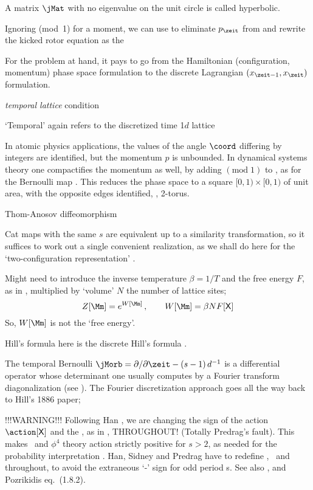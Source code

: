 \begin{description}
{A matrix $\jMat$ with no eigenvalue on the unit circle is called
hyperbolic.

Ignoring (mod~1) for a moment, we can use
 to eliminate
$p_{\zeit}$ from 
and rewrite the kicked rotor equation as the

For the problem at
hand, it pays to go from the Hamiltonian (configuration, momentum) phase
space formulation to the discrete Lagrangian
$(\ssp_{\zeit-1},\ssp_{\zeit})$ formulation.

\emph{temporal lattice} condition

`Temporal' again refers to the discretized time 1$d$ lattice

In atomic physics applications, the values of the angle $\coord$
differing by integers are identified, but the momentum $p$ is unbounded.
In dynamical systems theory one compactifies the momentum as well, by
adding $(\mbox{mod}\;1)$ to , as for the Bernoulli map
. This reduces the phase space to a square
$[0,1)\times [0,1)$ of unit area, with the opposite edges identified,
\ie, 2-torus.

Thom-Anosov diffeomorphism

Cat maps with the same $s$ are equivalent
up to a similarity transformation, so it suffices to work out a single
convenient realization, as we shall do here for the
\PV{} `two-configuration representation'
.

    }

     {
    Might need to introduce the inverse temperature $\beta = 1/T$ and the
    free energy $F$, as in , multiplied by `volume' $N$
    the number of lattice sites;
\[
  Z[\source]	= e^{W[\source]}
  \,,\qquad
  W[\source] = \beta N F[\Xx]
\]
    So, $W[\source]$ is not the `free energy'.

Hill's formula here is the discrete Hill's formula
.

The temporal Bernoulli {\jacobianOrb} %
$\jMorb=\partial/\partial\zeit-(s-1)\,\shift^{-1}$ is a differential
operator whose determinant one usually computes by a Fourier transform
diagonalization (see ). The Fourier discretization
approach goes all the way back to Hill's 1886 paper;
    }

 {
                    {\color{red}
!!!WARNING!!!
Following Han , we are changing the sign of the
action $\action[\Xx]$ and the {\jacobianOrb}, as in ,
THROUGHOUT! (Totally Predrag's fault).
This makes \catlatt\ and {$\phi^4$} theory action strictly positive
for
${s}>2$, as
needed for the probability interpretation .
                    }
Han, Sidney and Predrag have to redefine
\templatt, \catlatt\ and \henlatt\ {\jacobianOrbs} throughout, to avoid the
extraneous `-' sign for odd period {\lattstate}s.
%
See also , and Pozrikidis
 eq.~(1.8.2).
    }


\end{description}

